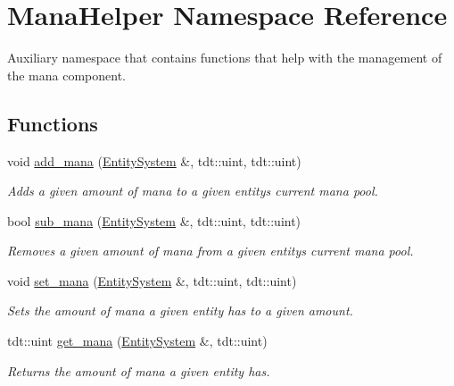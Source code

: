 \hypertarget{namespace_mana_helper}{}\section{Mana\+Helper Namespace Reference}
\label{namespace_mana_helper}


Auxiliary namespace that contains functions that help with the management of the mana component.  


\subsection*{Functions}
\begin{DoxyCompactItemize}
\item 
void \hyperlink{namespace_mana_helper_a3f6671c4e4644b5d4301f4b1b582dd87}{add\+\_\+mana} (\hyperlink{class_entity_system}{Entity\+System} \&, tdt\+::uint, tdt\+::uint)
\begin{DoxyCompactList}\small\item\em Adds a given amount of mana to a given entity\textquotesingle{}s current mana pool. \end{DoxyCompactList}\item 
bool \hyperlink{namespace_mana_helper_a37ca6fcd83b793fa0f068902d4c385e5}{sub\+\_\+mana} (\hyperlink{class_entity_system}{Entity\+System} \&, tdt\+::uint, tdt\+::uint)
\begin{DoxyCompactList}\small\item\em Removes a given amount of mana from a given entity\textquotesingle{}s current mana pool. \end{DoxyCompactList}\item 
void \hyperlink{namespace_mana_helper_a7fd03778a900ea84ea8a42ae8d1da1ff}{set\+\_\+mana} (\hyperlink{class_entity_system}{Entity\+System} \&, tdt\+::uint, tdt\+::uint)
\begin{DoxyCompactList}\small\item\em Sets the amount of mana a given entity has to a given amount. \end{DoxyCompactList}\item 
tdt\+::uint \hyperlink{namespace_mana_helper_a198af0a28bde35bb0b98ed6753a97c16}{get\+\_\+mana} (\hyperlink{class_entity_system}{Entity\+System} \&, tdt\+::uint)
\begin{DoxyCompactList}\small\item\em Returns the amount of mana a given entity has. \end{DoxyCompactList}\item 

\end{DoxyCompactItemize}
